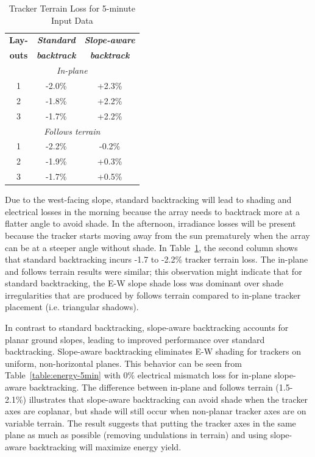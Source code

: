 \documentclass[conference]{IEEEtran}
\begin{document}
\begin{table}[htbp]
\caption{Tracker Terrain Loss for 5-minute Input Data}
\begin{center}
\begin{tabular}{|c|c|c|}
\hline
\textbf{Lay-}& \textbf{\textit{Standard}}& \textbf{\textit{Slope-aware}} \\
\textbf{outs}& \textbf{\textit{backtrack}}&    \textbf{\textit{backtrack}}\\
\hline
\multicolumn{3}{|c|}{\textit{In-plane}} \\
\hline
1& -2.0\% & +2.3\% \\
\hline
2& -1.8\% & +2.2\% \\
\hline
3& -1.7\% & +2.2\% \\
\hline
\multicolumn{3}{|c|}{\textit{Follows terrain}} \\
\hline
1& -2.2\% & -0.2\%  \\
\hline
2& -1.9\% & +0.3\%  \\
\hline
3& -1.7\% & +0.5\%  \\
\hline
\end{tabular}
\label{table:terrain-loss-5min}
\end{center}
\end{table}

Due to the west-facing slope, standard backtracking will lead to shading and electrical losses in the morning because the array needs to backtrack more at a flatter angle to avoid shade. In the afternoon, irradiance losses will be present because the tracker starts moving away from the sun prematurely when the array can be at a steeper angle without shade. In Table~\ref{table:terrain-loss-5min}, the second column shows that standard backtracking incurs -1.7 to -2.2\% tracker terrain loss. The in-plane and follows terrain results were similar; this observation might indicate that for standard backtracking, the E-W slope shade loss was dominant over shade irregularities that are produced by follows terrain compared to in-plane tracker placement (i.e. triangular shadows).

In contrast to standard backtracking, slope-aware backtracking accounts for planar ground slopes, leading to improved performance over standard backtracking. Slope-aware backtracking eliminates E-W shading for trackers on uniform, non-horizontal planes. This behavior can be seen from Table~\ref{table:energy-5min} with 0\% electrical mismatch loss for in-plane slope-aware backtracking. The difference between in-plane and follows terrain (1.5-2.1\%) illustrates that slope-aware backtracking can avoid shade when the tracker axes are coplanar, but shade will still occur when non-planar tracker axes are on variable terrain. The result suggests that putting the tracker axes in the same plane as much as possible (removing undulations in terrain) and using slope-aware backtracking will maximize energy yield.
\end{document}
